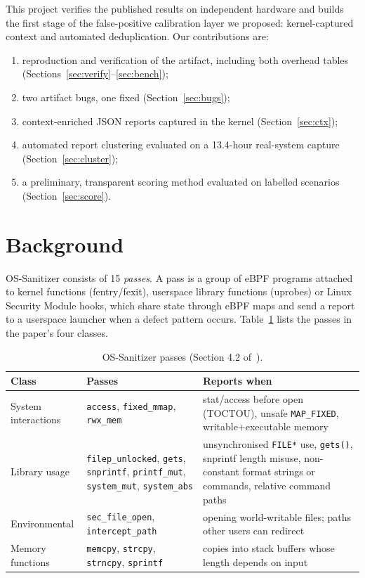 \documentclass[11pt,a4paper]{article}
\newcommand{\pass}[1]{\texttt{#1}}
\begin{document}
This project verifies the published results on independent hardware and builds the first stage of
the false-positive calibration layer we proposed: kernel-captured context and automated
deduplication. Our contributions are:
\begin{enumerate}
  \item reproduction and verification of the artifact, including both overhead tables
  (Sections~\ref{sec:verify}--\ref{sec:bench});
  \item two artifact bugs, one fixed (Section~\ref{sec:bugs});
  \item context-enriched JSON reports captured in the kernel (Section~\ref{sec:ctx});
  \item automated report clustering evaluated on a 13.4-hour real-system capture
  (Section~\ref{sec:cluster});
  \item a preliminary, transparent scoring method evaluated on labelled scenarios
  (Section~\ref{sec:score}).
\end{enumerate}

\section{Background}

OS-Sanitizer consists of 15 \emph{passes}. A pass is a group of eBPF programs attached to kernel
functions (fentry/fexit), userspace library functions (uprobes) or Linux Security Module hooks,
which share state through eBPF maps and send a report to a userspace launcher when a defect pattern
occurs. Table~\ref{tab:passes} lists the passes in the paper's four classes.

\begin{table}[H]
\centering\small
\caption{OS-Sanitizer passes (Section 4.2 of~\cite{ossan}).}
\label{tab:passes}
\begin{tabularx}{\linewidth}{@{}>{\raggedright}p{2.6cm} >{\raggedright}p{4.4cm} >{\raggedright\arraybackslash}X@{}}
\toprule
Class & Passes & Reports when \\
\midrule
System interactions & \pass{access}, \pass{fixed\_mmap}, \pass{rwx\_mem} & stat/access before open (TOCTOU), unsafe \texttt{MAP\_FIXED}, writable+executable memory \\
Library usage & \pass{filep\_unlocked}, \pass{gets}, \pass{snprintf}, \pass{printf\_mut}, \pass{system\_mut}, \pass{system\_abs} & unsynchronised \texttt{FILE*} use, \texttt{gets()}, snprintf length misuse, non-constant format strings or commands, relative command paths \\
Environmental & \pass{sec\_file\_open}, \pass{intercept\_path} & opening world-writable files; paths other users can redirect \\
Memory functions & \pass{memcpy}, \pass{strcpy}, \pass{strncpy}, \pass{sprintf} & copies into stack buffers whose length depends on input \\
\bottomrule
\end{tabularx}
\end{table}
\end{document}
